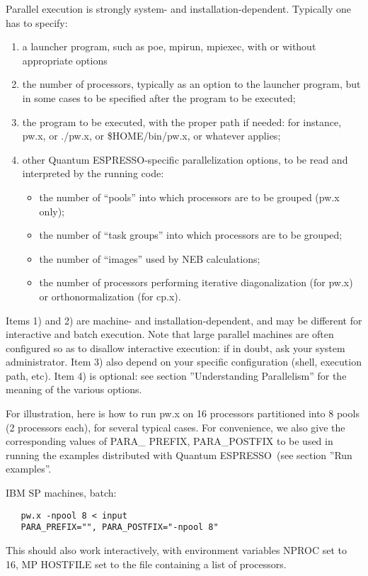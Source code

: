 \documentclass[12pt,a4paper]{article}
\def\qe{{\sc Quantum ESPRESSO}}
\begin{document}
Parallel execution is strongly system- and installation-dependent. Typically
one has to specify:
\begin{enumerate}
\item a launcher program, such as poe, mpirun, mpiexec, with or
  without  appropriate options 
\item the number of processors, typically as an option to the launcher
  program,  but in some cases to be specified after the program to be
  executed; 
\item the program to be executed, with the proper path if needed: for
  instance, pw.x, or ./pw.x, or \$HOME/bin/pw.x, or whatever applies; 
\item other \qe-specific parallelization options, to be
  read and interpreted by the running code: 
\begin{itemize}
\item the number of ``pools'' into which processors are to be grouped
  (pw.x only);
\item the number of ``task groups'' into which processors are to be
  grouped;
\item the number of ``images'' used by NEB calculations;
\item the number of processors performing iterative diagonalization
  (for pw.x) or orthonormalization (for cp.x).
\end{itemize}
\end{enumerate}
Items 1) and 2) are machine- and installation-dependent, and may be 
different for interactive and batch execution. Note that large
parallel machines are  often  configured so as to disallow interactive
execution: if in doubt, ask your system administrator.
Item 3) also depend on your specific configuration (shell, execution
path, etc). 
Item 4) is optional: see section ''Understanding Parallelism''
for the meaning of the various options.

For illustration, here is how to run pw.x on 16 processors partitioned into
8 pools (2 processors each), for several typical cases. For convenience, we
also give the corresponding values of PARA\_ PREFIX, PARA\_POSTFIX to
be used in running the examples distributed with \qe\ (see
section ''Run examples''.

IBM SP machines, batch:
\begin{verbatim}
   pw.x -npool 8 < input
   PARA_PREFIX="", PARA_POSTFIX="-npool 8"
\end{verbatim}
This should also work interactively, with environment variables NPROC
set to 16, MP HOSTFILE set to the file containing a list of processors.
\end{document}
